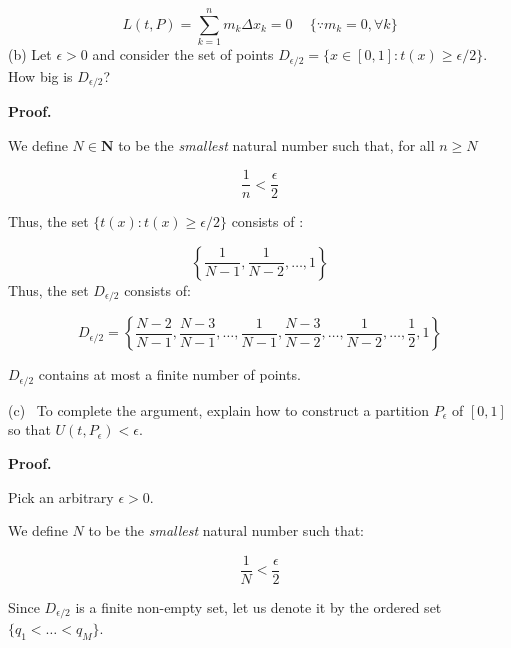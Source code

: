 \documentclass[10pt]{article}
\begin{document}
\begin{equation*}
L( t,P) =\sum _{k=1}^{n} m_{k} \Delta x_{k} =0\ \quad \{\because m_{k} =0,\forall k\}
\end{equation*}
(b) Let $\displaystyle \epsilon  >0$ and consider the set of points $\displaystyle D_{\epsilon /2} =\{x\in [ 0,1] :t( x) \geq \epsilon /2\}$. How big is $\displaystyle D_{\epsilon /2}$?



\textbf{Proof.}



We define $\displaystyle N\in \mathbf{N}$ to be the \textit{smallest} natural number such that, for all $n \geq N$


\begin{equation*}
\frac{1}{n} < \frac{\epsilon }{2}
\end{equation*}

Thus, the set $\displaystyle \{t( x) :t( x) \geq \epsilon /2\}$ consists of :


\begin{equation*}
\left\{\frac{1}{N-1} ,\frac{1}{N-2} ,\dotsc ,1\right\}
\end{equation*}
Thus, the set $\displaystyle D_{\epsilon /2}$ consists of:


\begin{equation*}
D_{\epsilon /2} =\left\{\frac{N-2}{N-1} ,\frac{N-3}{N-1} ,\dotsc ,\frac{1}{N-1} ,\frac{N-3}{N-2} ,\dotsc ,\frac{1}{N-2} ,\dotsc ,\frac{1}{2} ,1\right\}
\end{equation*}


$\displaystyle D_{\epsilon /2}$ contains at most a finite number of points. 



(c) \ To complete the argument, explain how to construct a partition $\displaystyle P_{\epsilon }$ of $\displaystyle [ 0,1]$ so that $\displaystyle U( t,P_{\epsilon }) < \epsilon $. 



\textbf{Proof.}



Pick an arbitrary $\displaystyle \epsilon  >0$. 


We define $N$ to be the \textit{smallest} natural number such that:


\begin{equation*}
\frac{1}{N} < \frac{\epsilon }{2}
\end{equation*}

Since $D_{\epsilon/2}$ is a finite non-empty set, let us denote it by the ordered set $\{q_1< \ldots <q_M\}$.
\end{document}

